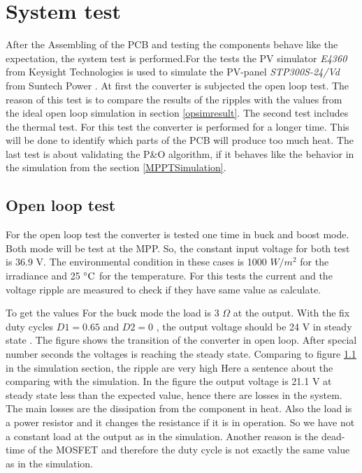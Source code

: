 \section{System test}
After the Assembling of the PCB and testing the components behave like the expectation, the system test is performed.For the tests the PV simulator \textit{E4360} from Keysight Technologies is used to simulate the PV-panel \textit{STP300S-24/Vd} from Suntech Power \cite{PV_simulator}. At first the converter is subjected the open loop test. The reason of this test is to compare the results of the ripples with the values from the ideal open loop simulation in section \ref{opsimresult}. The second test includes the thermal test. For this test the converter is performed for a longer time. This will be done to identify which parts of the PCB will produce too much heat. The last test is about validating the P\&O algorithm, if it behaves like the behavior in the simulation from the section \ref{MPPTSimulation}.

\subsection{Open loop test}
For the open loop test the converter is tested one time in buck and boost mode. Both mode will be test at the MPP. So, the constant input voltage for both test is 36.9 V. The environmental condition in these cases is 1000 $W /m^2$ for the irradiance and 25 $\decC$ for the temperature. For this tests the current and the voltage ripple are measured to check if they have same value as calculate. %

To get the values 
For the buck mode the load is 3 $\Omega$ at the output. With the fix duty cycles $D1 = 0.65$ and  $D2 = 0$ , the output voltage should be 24 V in steady state . The figure shows the transition of the converter in open loop. After special number seconds  the voltages is reaching the steady state. Comparing to figure \ref{} in the simulation section, the ripple are very high Here a sentence about the comparing with the simulation.  In the figure the output voltage is 21.1 V  at steady state less than the expected value, hence there are losses in the system.
The main losses are the dissipation from the component in heat. Also the load is a power resistor and it changes the resistance if it is in operation. So we have not a constant load at the output as in the simulation. Another reason is the dead-time of the MOSFET and therefore the duty cycle is not exactly the same value as in the simulation. 

